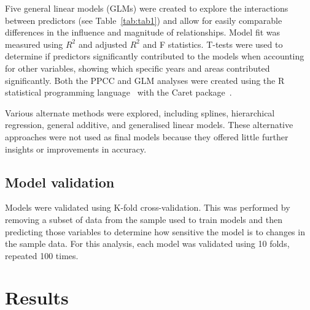 \documentclass[10pt,letterpaper]{article}
\begin{document}
\par
Five general linear models (GLMs) were created to explore the interactions between predictors (see Table~\ref{tab:tab1}) and allow for easily comparable differences in the influence and magnitude of relationships. Model fit was measured using $R^2$ and adjusted $R^2$ and F statistics. T-tests were used to determine if predictors significantly contributed to the models when accounting for other variables, showing which specific years and areas contributed significantly. Both the PPCC and GLM analyses were created using the R statistical programming language~\cite{rcoreteamLanguageEnvironmentStatistical2021} with the Caret package~\cite{kuhnBuildingPredictiveModels2008}. 
\par
Various alternate methods were explored, including splines, hierarchical regression, general additive, and generalised linear models. These alternative approaches were not used as final models because they offered little further insights or improvements in accuracy.
\par
\subsection*{Model validation}
Models were validated using K-fold cross-validation. This was performed by removing a subset of data from the sample used to train models and then predicting those variables to determine how sensitive the model is to changes in the sample data. For this analysis, each model was validated using 10 folds, repeated 100 times.
\par
\section*{Results}
\end{document}
